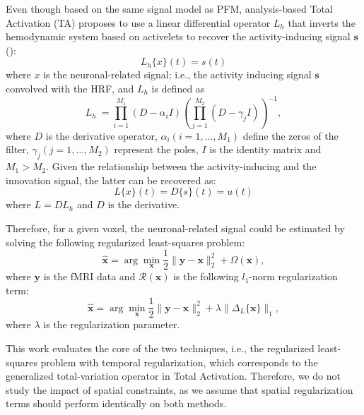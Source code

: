 Even though based on the same signal model as PFM, analysis-based Total Activation (TA) proposes to use a linear differential operator \(L_h\) that inverts the hemodynamic system based on activelets to recover the activity-inducing signal \(\mathbf{s}\) (\citealt{karahanoglu2013TotalActivationFMRI,khalidov2011activelets,karahanoglu2011SignalProcessingApproacha}):
\begin{equation}
    L_h\{x\}(t) = s(t)
\end{equation}
where \(x\) is the neuronal-related signal; i.e., the activity inducing signal \(\mathbf{s}\) convolved with the HRF, and \(L_h\) is defined as
\begin{equation}
    L_h\ = \prod_{i=1}^{M_1} (D-\alpha_i I) (\prod_{j=1}^{M_2} (D - \gamma_j I))^{-1},
\end{equation}
where \(D\) is the derivative operator, \(\alpha_i (i=1, \hdots, M_1)\) define the zeros of the filter, \(\gamma_j (j=1, \hdots, M_2)\) represent the poles, \(I\) is the identity matrix and \(M_1 > M_2\). Given the relationship between the activity-inducing and the innovation signal, the latter can be recovered as:
\begin{equation}
    L\{x\}(t) = D\{s\}(t) = u(t)
\end{equation}
where \(L = DL_h\) and \(D\) is the derivative.

Therefore, for a given voxel, the neuronal-related signal could be estimated by solving the following regularized least-squares problem:
\begin{equation}
    \hat{\mathbf{x}} = \arg \min_{\mathbf{x}} \frac{1}{2} \| \mathbf{y} - \mathbf{x} \|_2^2 + \Omega(\mathbf{x}),
\end{equation}
where \(\mathbf{y}\) is the fMRI data and \(\mathcal{R}(\mathbf{x})\) is the following \(l_1\)-norm regularization term:
\begin{equation}
    \hat{\mathbf{x}} = \arg \min_{\mathbf{x}} \frac{1}{2} \| \mathbf{y} - \mathbf{x} \|_2^2 + \lambda \| \Delta_L \{\mathbf{x}\} \|_1,
\end{equation}
where \(\lambda\) is the regularization parameter.

This work evaluates the core of the two techniques, i.e., the regularized least-squares problem with temporal regularization, which corresponds to the generalized total-variation operator in Total Activation. Therefore, we do not study the impact of spatial constraints, as we assume that spatial regularization terms should perform identically on both methods.